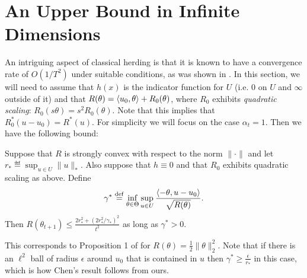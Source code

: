 \documentclass[paper.tex]{subfiles}
\begin{document}
\section{An Upper Bound in Infinite Dimensions}
\label{sec:chen-proofs}

An intriguing aspect of classical herding is that it is known to have a convergence rate of 
$O(1/T^2)$ under suitable conditions, as was shown in \citet{Chen:2010a}. In this section, 
we will need to assume that $h(x)$ is the indicator function for $U$ (i.e. $0$ on $U$ and 
$\infty$ outside of it) and that $R(\theta) = \left\langle u_0, \theta \right\rangle + R_0(\theta)$, where 
$R_0$ exhibits \emph{quadratic scaling}: $R_0(s\theta) = s^2R_0(\theta)$. Note that 
this implies that $R_0^*(u-u_0) = R^*(u)$.
For simplicity 
we will focus on the case $\alpha_t = 1$. Then we have 
the following bound:
\begin{theorem}
\label{thm:chen}
Suppose that $R$ is strongly convex with respect to the norm $\|\cdot\|$ and 
let $r_* \eqdef \sup_{u \in U} \|u\|_*$. Also suppose that $h \equiv 0$ and 
that $R_0$ exhibits quadratic scaling as above. Define 
\[ \gamma^* \stackrel{\mathrm{def}}{=} \inf_{\theta \in \Theta} \sup_{u \in U} \frac{\left\langle -\theta, u-u_0 \right\rangle}{\sqrt{R(\theta)}}. \]
Then $R(\theta_{t+1}) \leq \frac{2r_*^2+(2r_*^2/\gamma_*)^2}{t^2}$ as long 
as $\gamma^* > 0$.
\end{theorem}
This corresponds to Proposition 1 of \citet{Chen:2010b} for $R(\theta) = \frac{1}{2}\|\theta\|_2^2$. Note that if there is an $\ell^2$ ball of radius $\epsilon$ 
around $u_0$ that is contained in $u$ then $\gamma^* \geq \frac{\epsilon}{r_*}$ 
in this case, which is how Chen's result follows from ours.
\end{document}
